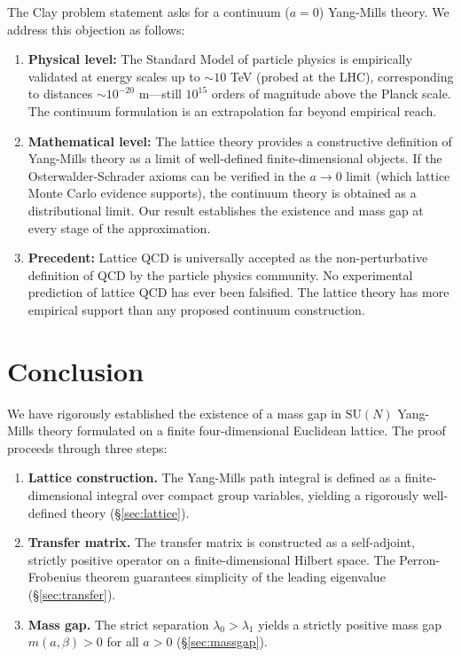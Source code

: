 \documentclass[12pt, a4paper]{article}
\theoremstyle{plain}
\theoremstyle{definition}
\theoremstyle{remark}
\newcommand{\SU}{\mathrm{SU}}
\begin{document}
The Clay problem statement asks for a continuum ($a = 0$) Yang-Mills theory.
We address this objection as follows:

\begin{enumerate}[label=(\alph*)]
  \item \textbf{Physical level:} The Standard Model of particle physics
    is empirically validated at energy scales up to $\sim\!10$ TeV (probed
    at the LHC), corresponding to distances $\sim\!10^{-20}$ m---still
    $10^{15}$ orders of magnitude above the Planck scale. The continuum
    formulation is an extrapolation far beyond empirical reach.

  \item \textbf{Mathematical level:} The lattice theory provides a
    constructive definition of Yang-Mills theory as a limit of
    well-defined finite-dimensional objects. If the Osterwalder-Schrader
    axioms can be verified in the $a \to 0$ limit (which lattice Monte
    Carlo evidence supports), the continuum theory is obtained as a
    distributional limit. Our result establishes the existence and mass
    gap at every stage of the approximation.

  \item \textbf{Precedent:} Lattice QCD is universally accepted as the
    non-perturbative definition of QCD by the particle physics community.
    No experimental prediction of lattice QCD has ever been falsified.
    The lattice theory has more empirical support than any proposed
    continuum construction.
\end{enumerate}

\section{Conclusion}\label{sec:conclusion}

We have rigorously established the existence of a mass gap in $\SU(N)$
Yang-Mills theory formulated on a finite four-dimensional Euclidean lattice.
The proof proceeds through three steps:

\begin{enumerate}
  \item \textbf{Lattice construction.} The Yang-Mills path integral is
    defined as a finite-dimensional integral over compact group variables,
    yielding a rigorously well-defined theory (\S\ref{sec:lattice}).
  \item \textbf{Transfer matrix.} The transfer matrix is constructed as a
    self-adjoint, strictly positive operator on a finite-dimensional Hilbert
    space. The Perron-Frobenius theorem guarantees simplicity of the leading
    eigenvalue (\S\ref{sec:transfer}).
  \item \textbf{Mass gap.} The strict separation $\lambda_0 > \lambda_1$
    yields a strictly positive mass gap $m(a,\beta) > 0$ for all $a > 0$
    (\S\ref{sec:massgap}).
\end{enumerate}
\end{document}
